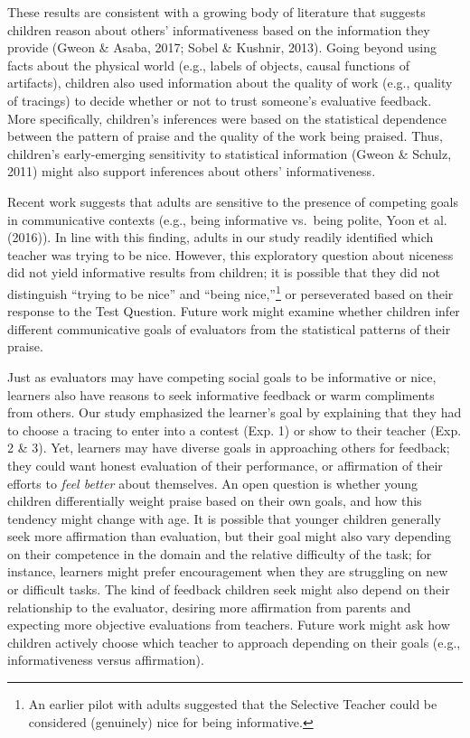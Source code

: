 \documentclass[10pt, letterpaper]{article}
\begin{document}
These results are consistent with a growing body of literature that
suggests children reason about others' informativeness based on the
information they provide (Gweon \& Asaba, 2017; Sobel \& Kushnir, 2013).
Going beyond using facts about the physical world (e.g., labels of
objects, causal functions of artifacts), children also used information
about the quality of work (e.g., quality of tracings) to decide whether
or not to trust someone's evaluative feedback. More specifically,
children's inferences were based on the statistical dependence between
the pattern of praise and the quality of the work being praised. Thus,
children's early-emerging sensitivity to statistical information (Gweon
\& Schulz, 2011) might also support inferences about others'
informativeness.

Recent work suggests that adults are sensitive to the presence of
competing goals in communicative contexts (e.g., being informative
vs.~being polite, Yoon et al. (2016)). In line with this finding, adults
in our study readily identified which teacher was trying to be nice.
However, this exploratory question about niceness did not yield
informative results from children; it is possible that they did not
distinguish ``trying to be nice'' and ``being nice,''\footnote{An
  earlier pilot with adults suggested that the Selective Teacher could
  be considered (genuinely) nice for being informative.} or perseverated
based on their response to the Test Question. Future work might examine
whether children infer different communicative goals of evaluators from
the statistical patterns of their praise.

Just as evaluators may have competing social goals to be informative or
nice, learners also have reasons to seek informative feedback or warm
compliments from others. Our study emphasized the learner's goal by
explaining that they had to choose a tracing to enter into a contest
(Exp. 1) or show to their teacher (Exp. 2 \& 3). Yet, learners may have
diverse goals in approaching others for feedback; they could want honest
evaluation of their performance, or affirmation of their efforts to
\textit{feel better} about themselves. An open question is whether young
children differentially weight praise based on their own goals, and how
this tendency might change with age. It is possible that younger
children generally seek more affirmation than evaluation, but their goal
might also vary depending on their competence in the domain and the
relative difficulty of the task; for instance, learners might prefer
encouragement when they are struggling on new or difficult tasks. The
kind of feedback children seek might also depend on their relationship
to the evaluator, desiring more affirmation from parents and expecting
more objective evaluations from teachers. Future work might ask how
children actively choose which teacher to approach depending on their
goals (e.g., informativeness versus affirmation).
\end{document}
